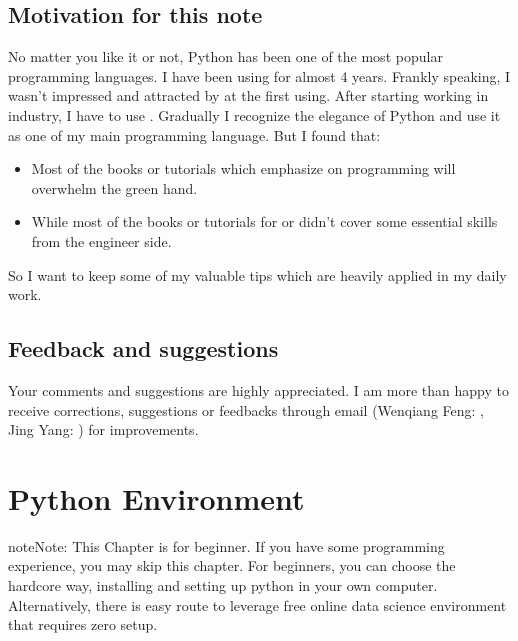 \documentclass[letterpaper,12pt,english]{sphinxmanual}
\begin{document}
\section{Motivation for this note}
\label{\detokenize{preface:motivation-for-this-note}}
\sphinxAtStartPar
No matter you like it or not, Python has been one of the most popular programming languages.
I have been using  for almost 4 years. Frankly speaking, I wasn’t impressed and attracted
by  at the first using. After starting working in industry, I have to use . Gradually
I recognize the elegance of Python and use it as one of my main programming language. But I found that:
\begin{itemize}
\item {} 
\sphinxAtStartPar
Most of the  books or tutorials which emphasize on programming will overwhelm the green hand.

\item {} 
\sphinxAtStartPar
While most of the  books or tutorials for  or  didn’t cover some essential skills
from the engineer side.

\end{itemize}

\sphinxAtStartPar
So I want to keep some of my valuable tips which are heavily applied in my daily work.


\section{Feedback and suggestions}
\label{\detokenize{preface:feedback-and-suggestions}}
\sphinxAtStartPar
Your comments and suggestions are highly appreciated. I am more than happy to receive
corrections, suggestions or feedbacks through email (Wenqiang Feng: ,
Jing Yang:  ) for improvements.


\chapter{Python Environment}
\label{\detokenize{install:python-environment}}\label{\detokenize{install:install}}\label{\detokenize{install::doc}}
\begin{sphinxadmonition}{note}{Note:}
\sphinxAtStartPar
This Chapter {\hyperref[\detokenize{install:install}]{}} is for beginner.  If you have some 
programming experience, you may skip this chapter. For beginners, you
can choose the hard\sphinxhyphen{}core way, installing and setting up python in your
own computer. Alternatively, there is easy route to leverage free online
data science environment that requires zero setup.
\end{sphinxadmonition}
\end{document}
